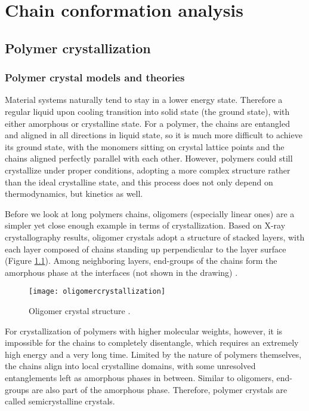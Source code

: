 \chapter{Chain conformation analysis}\label{chap_analysis}
\graphicspath{{./analysis/graphs/}}

\section{Polymer crystallization}

\subsection{Polymer crystal models and theories}

Material systems naturally tend to stay in a lower energy state. Therefore a regular liquid upon cooling transition into solid state (the ground state), with either amorphous or crystalline state. For a polymer, the chains are entangled and aligned in all directions in liquid state, so it is much more difficult to achieve its ground state, with the monomers sitting on crystal lattice points and the chains aligned perfectly parallel with each other. However, polymers could still crystallize under proper conditions, adopting a more complex structure rather than the ideal crystalline state, and this process does not only depend on thermodynamics, but kinetics as well.

Before we look at long polymers chains, oligomers (especially linear ones) are a simpler yet close enough example in terms of crystallization. Based on X-ray crystallography results, oligomer crystals adopt a structure of stacked layers, with each layer composed of chains standing up perpendicular to the layer surface (Figure \ref{fig:oligomercrystallization}). Among neighboring layers, end-groups of the chains form the amorphous phase at the interfaces (not shown in the drawing) \cite{Strobl2007}.

\begin{figure}[H]
\center
\vspace{1 cm}
\texttt{[image: oligomercrystallization]}
\caption[Oligomer crystal structure.]{Oligomer crystal structure \cite{Strobl2007}.}
\label{fig:oligomercrystallization}
\end{figure}

For crystallization of polymers with higher molecular weights, however, it is impossible for the chains to completely disentangle, which requires an extremely high energy and a very long time. Limited by the nature of polymers themselves, the chains align into local crystalline domains, with some unresolved entanglements left as amorphous phases in between. Similar to oligomers, end-groups are also part of the amorphous phase. Therefore, polymer crystals are called semicrystalline crystals.

